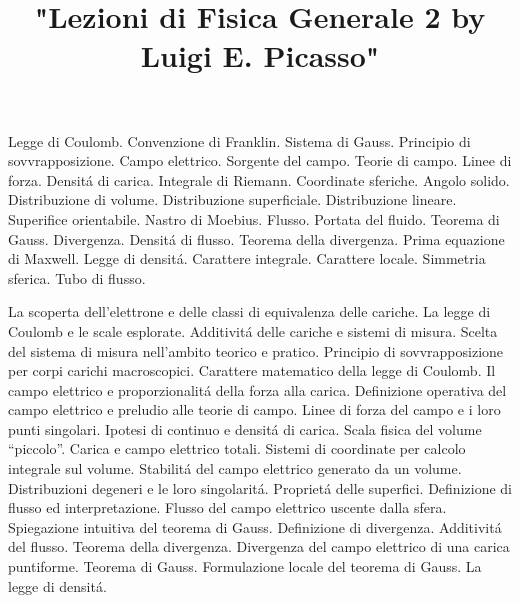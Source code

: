 

\usepackage[italian]{babel}

\title{"Lezioni di Fisica Generale 2 by Luigi E. Picasso"}


\maketitle

\begin{multicols}{3}
  Legge di Coulomb. Convenzione di Franklin. Sistema di Gauss. Principio di sovvrapposizione.
  Campo elettrico. Sorgente del campo. Teorie di campo. Linee di forza. Densit\'a di carica.
  Integrale di Riemann. Coordinate sferiche. Angolo solido. Distribuzione di volume.
  Distribuzione superficiale. Distribuzione lineare. Superifice orientabile. Nastro di Moebius. Flusso.
  Portata del fluido. Teorema di Gauss. Divergenza. Densit\'a di flusso. Teorema della divergenza.
  Prima equazione di Maxwell. Legge di densit\'a. Carattere integrale. Carattere locale. Simmetria sferica.
  Tubo di flusso.
\end{multicols}

\begin{multicols}{3}
  La scoperta dell'elettrone e delle classi di equivalenza delle cariche. La legge di Coulomb e le scale esplorate.
  Additivit\'a delle cariche e sistemi di misura.
  Scelta del sistema di misura nell'ambito teorico e pratico. Principio di sovvrapposizione per corpi carichi macroscopici.
  Carattere matematico della legge di Coulomb. Il campo elettrico e proporzionalit\'a della forza alla carica.
  Definizione operativa del campo elettrico e preludio alle teorie di campo.
  Linee di forza del campo e i loro punti singolari. Ipotesi di continuo e densit\'a di carica.
  Scala fisica del volume ``piccolo''. Carica e campo elettrico totali.
  Sistemi di coordinate per calcolo integrale sul volume.
  Stabilit\'a del campo elettrico generato da un volume. Distribuzioni degeneri e le loro singolarit\'a.
  Propriet\'a delle superfici. Definizione di flusso ed interpretazione.
  Flusso del campo elettrico uscente dalla sfera. Spiegazione intuitiva del teorema di Gauss. Definizione di divergenza.
  Additivit\'a del flusso. Teorema della divergenza.
  Divergenza del campo elettrico di una carica puntiforme. Teorema di Gauss.
  Formulazione locale del teorema di Gauss. La legge di densit\'a.
\end{multicols}

